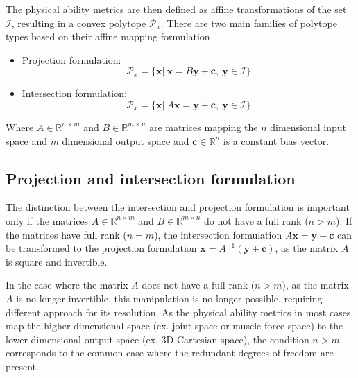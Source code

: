 The physical ability metrics are then defined as affine transformations of the set $\mathcal{I}$, resulting in a convex polytope $\mathcal{P}_x$. There are two main families of polytope types based on their affine mapping formulation 

\begin{itemize}
    \item Projection formulation: 
    \begin{equation}
        \mathcal{P}_x=\{\bm{x} |~ \bm{x} = B\bm{y} + \bm{c},~\bm{y} \in\mathcal{I} \}
        \label{eq:proj_poly}
    \end{equation}
    \item Intersection formulation: 
    \begin{equation}
        \mathcal{P}_x=\{\bm{x} |~ A\bm{x} = \bm{y}+ \bm{c},~ \bm{y} \in \mathcal{I}\}
        \label{eq:inter_poly}
    \end{equation}
\end{itemize}
Where $A\in \mathbb{R}^{n\times m }$ and $B\in \mathbb{R}^{m\times n}$ are matrices mapping the $n$ dimensional input space and $m$ dimensional output space  and $\bm{c} \in \mathbb{R}^n$ is a constant bias vector.

\subsection{Projection and intersection formulation}
The distinction between the intersection and projection formulation is important only if the matrices $A\in \mathbb{R}^{n\times m }$ and $B\in \mathbb{R}^{m\times n}$ do not have a full rank ($n\!>\!m$). If the matrices have full rank ($n\!=\!m$), the intersection formulation $A\bm{x} = \bm{y} + \bm{c}$ can be transformed to the projection formulation $\bm{x} = A^{-1}(\bm{y}+\bm{c})$, as the matrix $A$ is square  and invertible.  

In the case where the matrix $A$ does not have a full rank ($n\!>\!m$), as the matrix $A$ is no longer invertible, this manipulation is no longer possible, requiring different approach for its resolution. As the physical ability metrics in most cases map the higher dimensional space (ex. joint space or muscle force space) to the lower dimensional output space (ex. 3D Cartesian space), the condition $n\!>\!m$ corresponds to the common case where the redundant degrees of freedom are present. 


